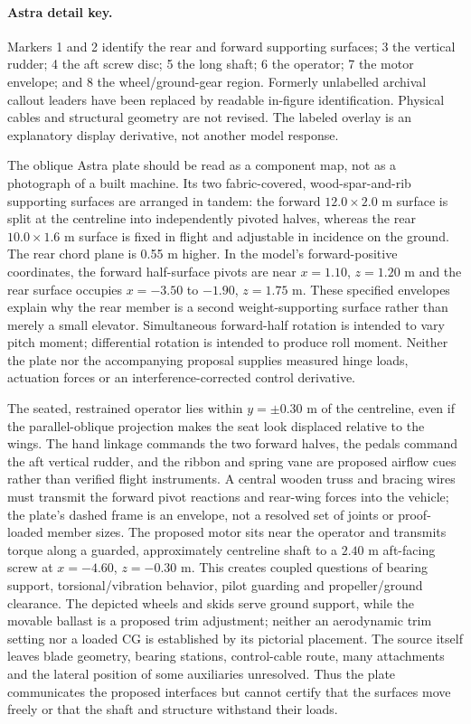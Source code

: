 \documentclass[11pt,a4paper]{article}
\begin{document}
\paragraph{Astra detail key.}
Markers 1 and 2 identify the rear and forward supporting surfaces;
3 the vertical rudder; 4 the aft screw disc; 5 the long shaft;
6 the operator; 7 the motor envelope; and 8 the wheel/ground-gear region.
Formerly unlabelled archival callout leaders have been replaced by readable
in-figure identification. Physical cables and structural geometry are not
revised. The labeled overlay is an explanatory display derivative, not
another model response.



The oblique Astra plate should be read as a component map, not as a photograph of a built machine. Its two fabric-covered, wood-spar-and-rib supporting surfaces are arranged in tandem: the forward $12.0\times2.0$ m surface is split at the centreline into independently pivoted halves, whereas the rear $10.0\times1.6$ m surface is fixed in flight and adjustable in incidence on the ground. The rear chord plane is 0.55 m higher. In the model's forward-positive coordinates, the forward half-surface pivots are near $x=1.10$, $z=1.20$ m and the rear surface occupies $x=-3.50$ to $-1.90$, $z=1.75$ m. These specified envelopes explain why the rear member is a second weight-supporting surface rather than merely a small elevator. Simultaneous forward-half rotation is intended to vary pitch moment; differential rotation is intended to produce roll moment. Neither the plate nor the accompanying proposal supplies measured hinge loads, actuation forces or an interference-corrected control derivative.

The seated, restrained operator lies within $y=\pm0.30$ m of the centreline, even if the parallel-oblique projection makes the seat look displaced relative to the wings. The hand linkage commands the two forward halves, the pedals command the aft vertical rudder, and the ribbon and spring vane are proposed airflow cues rather than verified flight instruments. A central wooden truss and bracing wires must transmit the forward pivot reactions and rear-wing forces into the vehicle; the plate's dashed frame is an envelope, not a resolved set of joints or proof-loaded member sizes. The proposed motor sits near the operator and transmits torque along a guarded, approximately centreline shaft to a $2.40$ m aft-facing screw at $x=-4.60$, $z=-0.30$ m. This creates coupled questions of bearing support, torsional/vibration behavior, pilot guarding and propeller/ground clearance. The depicted wheels and skids serve ground support, while the movable ballast is a proposed trim adjustment; neither an aerodynamic trim setting nor a loaded CG is established by its pictorial placement. The source itself leaves blade geometry, bearing stations, control-cable route, many attachments and the lateral position of some auxiliaries unresolved. Thus the plate communicates the proposed interfaces but cannot certify that the surfaces move freely or that the shaft and structure withstand their loads.
\end{document}
